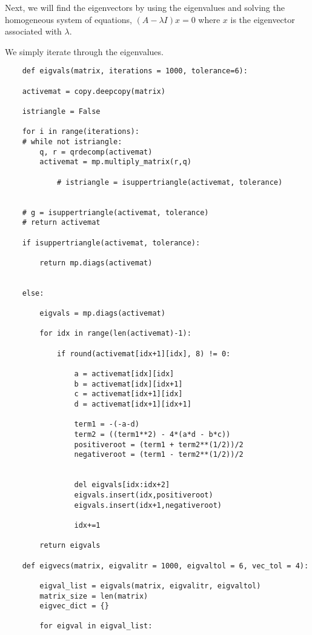 \documentclass[12pt, a4paper]{article}
\begin{document}
Next, we will find the eigenvectors by using the eigenvalues and solving the homogeneous system of equations, $(A-\lambda I)x = 0$  where $x$ is the eigenvector associated with $\lambda$. 

We simply iterate through the eigenvalues.

\begin{lstlisting}
    def eigvals(matrix, iterations = 1000, tolerance=6):

    activemat = copy.deepcopy(matrix)

    istriangle = False

    for i in range(iterations):
    # while not istriangle:
        q, r = qrdecomp(activemat)
        activemat = mp.multiply_matrix(r,q)

            # istriangle = isuppertriangle(activemat, tolerance)


    # g = isuppertriangle(activemat, tolerance)
    # return activemat

    if isuppertriangle(activemat, tolerance):

        return mp.diags(activemat)


    else:

        eigvals = mp.diags(activemat)

        for idx in range(len(activemat)-1):

            if round(activemat[idx+1][idx], 8) != 0:

                a = activemat[idx][idx]
                b = activemat[idx][idx+1]
                c = activemat[idx+1][idx]
                d = activemat[idx+1][idx+1]

                term1 = -(-a-d)
                term2 = ((term1**2) - 4*(a*d - b*c))
                positiveroot = (term1 + term2**(1/2))/2
                negativeroot = (term1 - term2**(1/2))/2


                del eigvals[idx:idx+2]
                eigvals.insert(idx,positiveroot)
                eigvals.insert(idx+1,negativeroot)

                idx+=1

        return eigvals

    def eigvecs(matrix, eigvalitr = 1000, eigvaltol = 6, vec_tol = 4):

        eigval_list = eigvals(matrix, eigvalitr, eigvaltol)
        matrix_size = len(matrix)
        eigvec_dict = {}

        for eigval in eigval_list:
            

\end{lstlisting}
\end{document}

